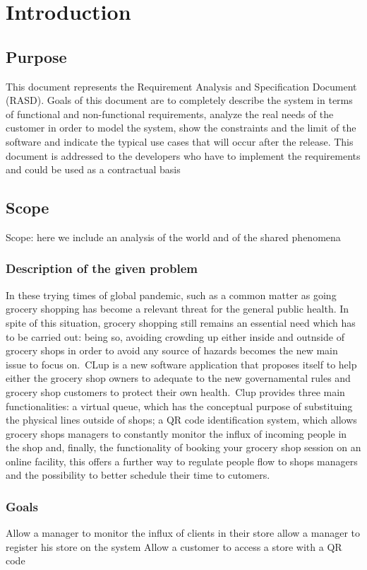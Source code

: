 \section{Introduction}
\label{sect:introduction}
\subsection{Purpose}
This document represents the Requirement Analysis and Specification Document (RASD). Goals of this document are to completely describe the system in terms of functional and non-functional requirements, analyze the real needs of the customer in order to model the system, show the constraints and the limit of the software and indicate the typical use cases that will occur after the release. This document is addressed to the developers who have to implement the requirements and could be used as a contractual basis
\subsection{Scope}
Scope: here we include an analysis of the world and of the shared phenomena
\subsubsection{Description of the given problem}
In these trying times of global pandemic, such as a common matter as going grocery shopping has become a relevant threat for the general public health. In spite of this situation, grocery shopping still remains an essential need which has to be carried out: being so, avoiding crowding up either inside and outnside of grocery shops in order to avoid any source of hazards becomes the new main issue to focus on.\ CLup is a new software application that proposes itself to help either the grocery shop owners to adequate to the new governamental rules and grocery shop customers to protect their own health.\ Clup provides three main functionalities: a virtual queue, which has the conceptual purpose of substituing the physical lines outside of shops; a QR code identification system, which allows grocery shops managers to constantly monitor the influx of incoming people in the shop and, finally, the functionality of booking your grocery shop session on an online facility, this offers a further way to regulate people flow to shops managers and the possibility to better schedule their time to cutomers.\subsubsection{Goals}
Allow a manager to monitor the influx of clients in their store 
allow a manager to register his store on the system
Allow a customer to access a store with a QR code

